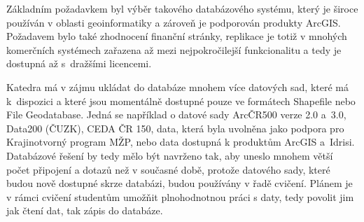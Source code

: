 Základním požadavkem byl výběr takového databázového systému, který je široce používán v oblasti geoinformatiky a zároveň je podporován produkty Arc\-GIS. Požadavem bylo také zhodnocení finanční stránky, replikace je totiž v mnohých komerčních systémech zařazena až mezi nejpokročilejší funkcionalitu a tedy je dostupná až s~dražšími licencemi. 

Katedra má v zájmu ukládat do databáze mnohem více datových sad, které má k~dispozici a které jsou momentálně dostupné pouze ve formátech Shapefile nebo File Geodatabase. Jedná se například o datové sady ArcČR500 verze 2.0 a~3.0, Data200 (ČUZK), CEDA ČR 150, data, která byla uvolněna jako podpora pro Krajinotvorný program MŽP, nebo data dostupná k produktům Arc\-GIS a~Idrisi. Databázové řešení by tedy mělo být navrženo tak, aby uneslo mnohem větší počet připojení a dotazů než v současné době, protože datového sady, které budou nově dostupné skrze databázi, budou používány v řadě cvičení. Plánem je v rámci cvičení studentům umožňit plnohodnotnou práci s daty, tedy povolit jim jak čtení dat, tak zápis do databáze. 


